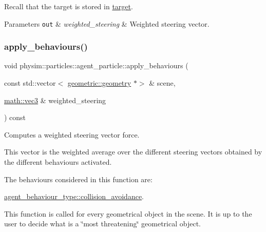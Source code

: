 Recall that the target is stored in \hyperlink{classphysim_1_1particles_1_1agent__particle_a0658207e11a5d39844856233ae8bf2cb}{target}. 
\begin{DoxyParams}[1]{Parameters}
\mbox{\tt out}  & {\em weighted\+\_\+steering} & Weighted steering vector. \\
\hline
\end{DoxyParams}
\mbox{\label{classphysim_1_1particles_1_1agent__particle_abd9976b5fd7b03ef4301878085e21fbc}} 
\subsubsection{\texorpdfstring{apply\+\_\+behaviours()}{apply\_behaviours()}\hspace{0.1cm}{\footnotesize\ttfamily [2/2]}}
{\footnotesize\ttfamily void physim\+::particles\+::agent\+\_\+particle\+::apply\+\_\+behaviours (\begin{DoxyParamCaption}\item[{const std\+::vector$<$ \hyperlink{classphysim_1_1geometric_1_1geometry}{geometric\+::geometry} $\ast$$>$ \&}]{scene,  }\item[{\hyperlink{structphysim_1_1math_1_1vec3}{math\+::vec3} \&}]{weighted\+\_\+steering }\end{DoxyParamCaption}) const}



Computes a weighted steering vector force. 

This vector is the weighted average over the different steering vectors obtained by the different behaviours activated.

The behaviours considered in this function are\+:
\begin{DoxyItemize}
\item \hyperlink{namespacephysim_1_1particles_a033757595f7862a0fc8a389d79bf9c88aa150bf2057adbf0518b8bd2a4019d5a4}{agent\+\_\+behaviour\+\_\+type\+::collision\+\_\+avoidance}.
\end{DoxyItemize}

This function is called for every geometrical object in the scene. It is up to the user to decide what is a \char`\"{}most threatening\char`\"{} geometrical object.

